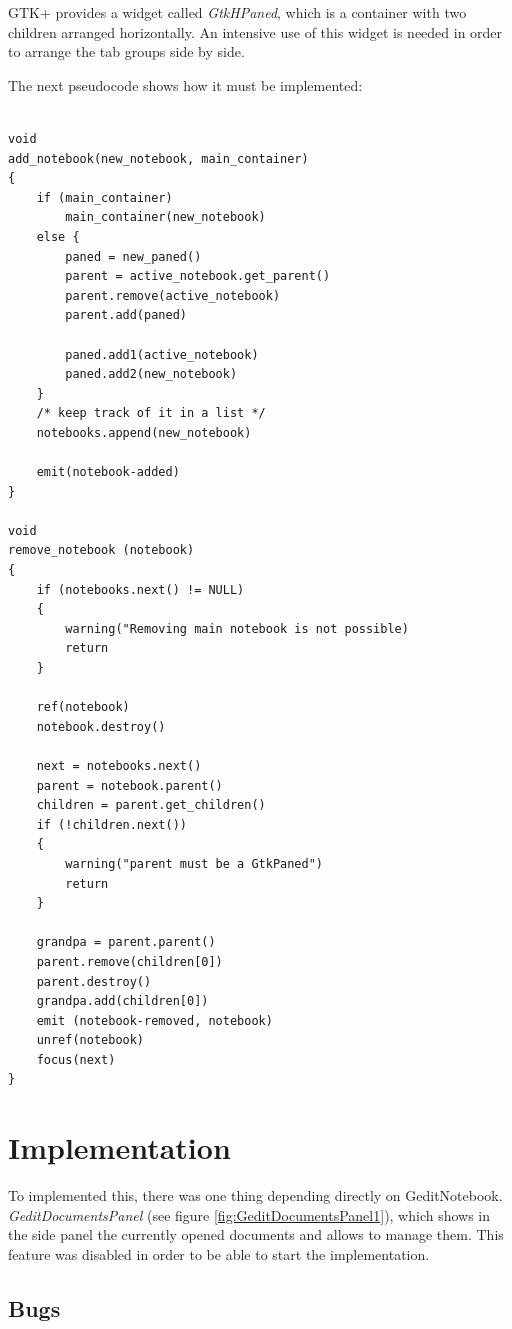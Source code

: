 GTK+ provides a widget called \emph{GtkHPaned}, which is a container with two children arranged horizontally. An intensive use of this widget is needed in order to arrange the tab groups side by side.

The next pseudocode shows how it must be implemented:
\begin{lstlisting}[style=GObject]

void
add_notebook(new_notebook, main_container)
{
	if (main_container)
		main_container(new_notebook)
	else {
		paned = new_paned()
		parent = active_notebook.get_parent()
		parent.remove(active_notebook)
		parent.add(paned)

		paned.add1(active_notebook)
		paned.add2(new_notebook)
	}
	/* keep track of it in a list */
	notebooks.append(new_notebook)

	emit(notebook-added)
}

void
remove_notebook (notebook)
{
	if (notebooks.next() != NULL)
	{
		warning("Removing main notebook is not possible)
		return
	}

	ref(notebook)
	notebook.destroy()

	next = notebooks.next()
	parent = notebook.parent()
	children = parent.get_children()
	if (!children.next())
	{
		warning("parent must be a GtkPaned")
		return
	}

	grandpa = parent.parent()
	parent.remove(children[0])
	parent.destroy()
	grandpa.add(children[0])
	emit (notebook-removed, notebook)
	unref(notebook)
	focus(next)
}

\end{lstlisting}

\newpage
\section{Implementation}

To implemented this, there was one thing depending directly on GeditNotebook. \emph{GeditDocumentsPanel} (see figure \ref{fig:GeditDocumentsPanel1}), which shows in the side panel the currently opened documents and allows to manage them. This feature was disabled in order to be able to start the implementation.


\subsection{Bugs}

